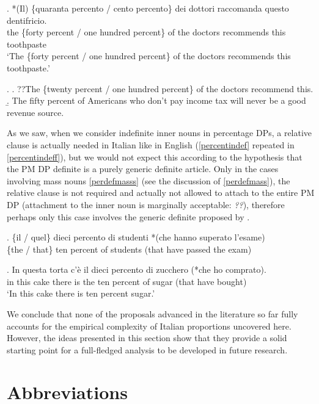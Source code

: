 \documentclass[charis, linguex]{glossa}
\begin{document}
\exg. *(Il) \{\checkmark quaranta percento / \checkmark cento percento\} dei dottori raccomanda questo dentifricio. \\
       the \{forty percent / {one hundred} percent\} {of the} doctors recommends this toothpaste \\
       \glt `The \{forty percent / one hundred percent\} of the doctors recommends this toothpaste.' \label{percent-it}

\ex. \a. ??The \{twenty percent / one hundred percent\} of the doctors recommend this.\label{percent-eng}
     \b. The fifty percent of Americans who don't pay income tax will never be a good revenue source. \label{FTimes}

As we saw, when we consider indefinite inner nouns in percentage DPs, a relative clause is actually needed in Italian like in English (\ref{percentindef} repeated in \ref{percentindeff}), but we would not expect this according to the hypothesis that the PM DP definite is a purely generic definite article. Only in the cases involving mass nouns \ref{perdefmasss} (see the discussion of \ref{perdefmass}), the relative clause is not required and actually not allowed to attach to the entire PM DP (attachment to the inner noun is marginally acceptable: \textit{??}), therefore perhaps only this case involves the generic definite proposed by \citet{fal19}.

\exg. \{il / quel\} dieci percento di studenti *(che hanno superato l'esame)\\
      \{the / that\} ten percent of students (that have passed {the exam})\\ \label{percentindeff}
	  
\exg. In questa torta c'\`{e} il dieci percento di zucchero (*che ho comprato).\\ 
	  in this cake {there is} the ten percent of sugar (that have bought) \\ 
     \glt `In this cake there is ten percent sugar.' \label{perdefmasss}
	 

We conclude that none of the proposals advanced in the literature so far fully accounts for the empirical complexity of Italian proportions uncovered here. However, the ideas presented in this section show that they provide a solid starting point for a full-fledged analysis to be developed in future research. 

\section*{Abbreviations} \label{abbrev}
\end{document}
